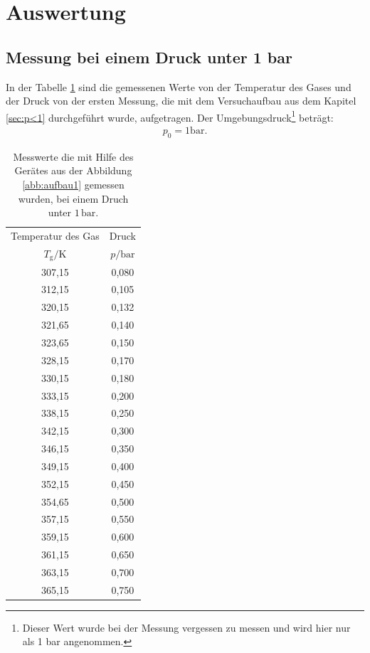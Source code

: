 \newpage
\section{Auswertung}
\label{sec:Auswertung}
\subsection{Messung bei einem Druck unter 1 bar}
In der Tabelle \ref{tab:p<1} sind die gemessenen Werte
von der Temperatur des Gases und der Druck
von der ersten Messung, die mit dem Versuchaufbau aus
dem Kapitel \ref{sec:p<1} durchgeführt wurde, aufgetragen.
Der Umgebungsdruck\footnote{Dieser Wert wurde bei der Messung vergessen zu messen und wird hier nur als 1 bar angenommen.}
 beträgt:
\begin{align*}
p_\mathrm{0}=1\si{\bar}.
\end{align*}
\begin{table}  %
  \centering
  \caption{Messwerte die mit Hilfe des Gerätes aus der Abbildung \ref{abb:aufbau1} gemessen wurden, bei einem Druch unter $1\,\si{\bar}$.}
  \label{tab:p<1}
  \begin{tabular}{c c}
    \toprule
    Temperatur des Gas &  Druck \\
    $T_\mathrm{g}/ \si{\kelvin}$ & $p/\si{\bar} $ \\
    \midrule
    307,15 & 0,080\\
    312,15 & 0,105\\
    320,15 & 0,132\\
    321,65 & 0,140\\
    323,65 & 0,150\\
    328,15 & 0,170\\
    330,15 & 0,180\\
    333,15 & 0,200\\
    338,15 & 0,250\\
    342,15 & 0,300\\
    346,15 & 0,350\\
    349,15 & 0,400\\
    352,15 & 0,450\\
    354,65 & 0,500\\
    357,15 & 0,550\\
    359,15 & 0,600\\
    361,15 & 0,650\\
    363,15 & 0,700\\
    365,15 & 0,750\\
    \bottomrule
  \end{tabular}
\end{table}
